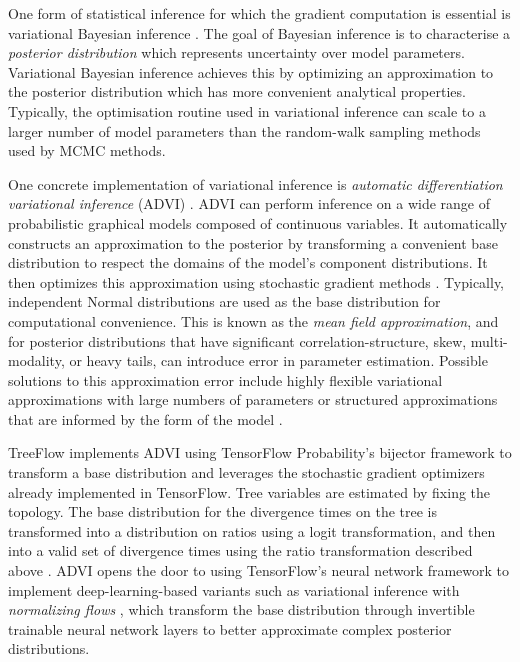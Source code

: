 One form of statistical inference for which the gradient computation is essential is variational Bayesian inference \cite{jordan1999introduction}. The goal of Bayesian inference is to characterise a \textit{posterior distribution} which represents uncertainty over model parameters. Variational Bayesian inference achieves this by optimizing an approximation to the posterior distribution which has more convenient analytical properties. Typically, the optimisation routine used in variational inference can scale to a larger number of model parameters than the random-walk sampling methods used by MCMC methods.

One concrete implementation of variational inference is \textit{automatic differentiation variational inference} (ADVI) \cite{kucukelbir2017automatic}. ADVI can perform inference on a wide range of probabilistic graphical models composed of continuous variables. It automatically constructs an approximation to the posterior by transforming a convenient base distribution to respect the domains of the model's component distributions. It then optimizes this approximation using stochastic gradient methods \cite{robbins1951stochastic, bottou2010large}. Typically, independent Normal distributions are used as the base distribution for computational convenience. This is known as the \textit{mean field approximation}, and for posterior distributions that have significant correlation-structure, skew, multi-modality, or heavy tails, can introduce error in parameter estimation. Possible solutions to this approximation error include highly flexible variational approximations with large numbers of parameters \cite{rezende2015variational} or structured approximations that are informed by the form of the model \cite{ambrogioni2021automatic}.

TreeFlow implements ADVI using TensorFlow Probability's bijector framework to transform a base distribution and leverages the stochastic gradient optimizers already implemented in TensorFlow. Tree variables are estimated by fixing the topology. The base distribution for the divergence times on the tree is transformed into a distribution on ratios using a logit transformation, and then into a valid set of divergence times using the ratio transformation described above \cite{yang2007paml}. ADVI opens the door to using TensorFlow's neural network framework to implement deep-learning-based variants such as variational inference with \textit{normalizing flows} \cite{rezende2015variational}, which transform the base distribution through invertible trainable neural network layers to better approximate complex posterior distributions.

